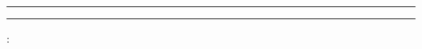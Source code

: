
\begin{titlepage}
	\Centering
	\vspace*{2cm}
	\Large \seriftext{\metaUniversity}\par\vspace{0.1cm}
	\large \seriftext{\metaFaculty}\par\vspace{0.1cm}
	\ifthenelse{\equal{\metaDepartment}{}}{}{\normalsize \seriftext{\metaDepartment}\par\vspace{0.1cm}}
	\textcolor{themecolour}{\rule{\linewidth}{0.5mm}}
	\vspace{0.2cm}
	\par{\LARGE \seriftext{\textbf{\metaAssignmentTitle}}}\par
	\vspace{0.2cm}
	\textcolor{themecolour}{\rule{\linewidth}{0.5mm}}\par\vspace{0.2cm}
	\normalsize \metaCourseCode : \metaCourseName\par\vspace{0.2cm}
	\begin{minipage}[t]{0.4\textwidth}
		\begin{FlushLeft}\normalsize
		\end{FlushLeft}
	\end{minipage}
	\hfill
	\begin{minipage}[t]{0.4\textwidth}
		\begin{FlushRight}\normalsize

\end{FlushRight}
\end{minipage}
\end{titlepage}
